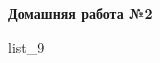 \documentclass[12pt, a4paper]{article}
\begin{document}
\begin{center}
	\large
	\textbf{Домашняя работа №2}
\end{center}
{list_9}
\end{document}
